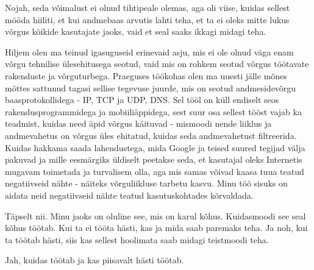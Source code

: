 Nojah, seda võimalust ei olnud tihtipeale olemas, aga oli  viise, kuidas 
sellest mööda hiiliti, et  kui andmebaas arvutis lahti teha, et ta ei oleks 
mitte lukus võrgus kõikide kasutajate jaoks, vaid et seal saaks ikkagi midagi 
teha. 


Hiljem olen ma teinud igasuguseid erinevaid asju, mis ei ole olnud väga enam  
võrgu tehnilise ülesehitusega seotud, vaid mis on rohkem seotud võrgus 
töötavate rakenduste ja võrguturbega. Praeguses töökohas olen ma uuesti jälle mõnes mõttes 
sattunud tagasi sellise tegevuse juurde, mis on seotud andmesidevõrgu 
baasprotokollidega - IP, TCP ja UDP, DNS. Sel tööl on küll 
endiselt seos  rakendusprogrammidega ja mobiiliäppidega,  
sest suur osa sellest tööst vajab ka teadmist, kuidas need äpid võrgus käituvad - mismoodi 
nende liiklus ja  andmevahetus on võrgus üles ehitatud, kuidas seda 
andmevahetust filtreerida. Kuidas hakkama saada lahendustega, 
mida Google ja teised suured tegijad  välja pakuvad ja mille eesmärgiks 
üldiselt peetakse seda, et kasutajal oleks Internetis mugavam toimetada  ja turvalisem olla, aga mis samas võivad kaasa tuua
teatud negatiivseid nähte - näiteks võrguliikluse tarbetu kasvu. Minu töö sisuks on 
aidata neid negatiivseid nähte teatud kasutuskohtades kõrvaldada.


Täpselt nii. Minu jaoks on oluline see, mis on karul kõhus. Kuidasmoodi see 
seal kõhus töötab. Kui ta ei tööta hästi, kas ja mida  saab paremaks teha. Ja 
noh, kui ta töötab hästi, siis kas sellest hoolimata  saab midagi 
teistmoodi teha.


Jah, kuidas töötab ja kas piisavalt hästi töötab.
